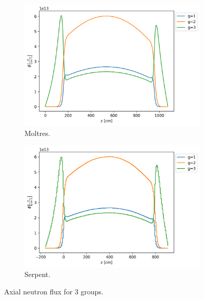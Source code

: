 \documentclass[11pt,letterpaper]{article}
\begin{document}
\begin{figure}[htbp!]
	\centering
	\begin{subfigure}[t]{0.4\textwidth}
		\centering
		\includegraphics[width=\linewidth]{figures/3D-assembly-noLBP-600-26G}
		\caption{Moltres.}
	\end{subfigure}
	\begin{subfigure}[t]{0.4\textwidth}
		\centering
		\includegraphics[width=\linewidth]{figures/serpent26G-noLBP-600-collapse}
		\caption{Serpent.}
	\end{subfigure}
	\hfill
	\caption{Axial neutron flux for 3 groups.}
	\label{fig:assembly-noLBP-600-flux}
\end{figure}
\end{document}
